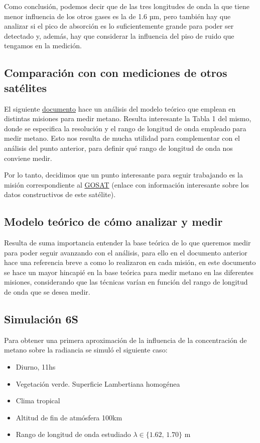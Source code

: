 \documentclass[titlepage,11pt]{article}
\begin{document}
Como conclusión, podemos decir que de las tres longitudes de onda la que tiene menor influencia de los otros gases es la de 1.6 µm, pero también hay que analizar si el pico de absorción es lo suficientemente grande para poder ser detectado y, además, hay que considerar la influencia del piso de ruido que tengamos en la medición.

\subsection{Comparación con con mediciones de otros satélites}

El siguiente \href{https://www.atmos-chem-phys.net/16/14371/2016/acp-16-14371-2016.pdf}{documento} hace un análisis del modelo teórico que emplean en distintas misiones para medir metano. Resulta interesante la Tabla 1 del mismo, donde se especifica la resolución y el rango de longitud de onda empleado para medir metano. Esto nos resulta de mucha utilidad para complementar con el análisis del punto anterior, para definir qué rango de longitud de onda nos conviene medir.

 Por lo tanto, decidimos que un punto interesante para seguir trabajando es la misión correspondiente al \href{https://www.spiedigitallibrary.org/conference-proceedings-of-spie/10563/105634O/Fourier-transform-spectrometer-on-GOSAT-and-GOSAT-2/10.1117/12.2304062.full?SSO=1}{GOSAT} (enlace con información interesante sobre los datos constructivos de este satélite).
 
\subsection{Modelo teórico de cómo analizar y medir \metano}
Resulta de suma importancia entender la base teórica de lo que queremos medir para poder seguir avanzando con el análisis, para ello en el documento anterior hace una referencia breve a como lo realizaron en cada misión, en este documento se hace un mayor hincapié en la base teórica para medir metano en las diferentes misiones, considerando que las técnicas varían en función del rango de longitud de onda que se desea medir.

\subsection{Simulación 6S}
Para obtener una primera aproximación de la influencia de la concentración de metano sobre la radiancia se simuló el siguiente caso:
\begin{itemize}
    \item Diurno, 11hs
    \item Vegetación verde. Superficie Lambertiana homogénea
    \item Clima tropical
    \item Altitud de fin de atmósfera 100km
    \item Rango de longitud de onda estudiado $\lambda \in \{ 1.62, \, 1.70\}$ \micro m
\end{itemize}
\end{document}

